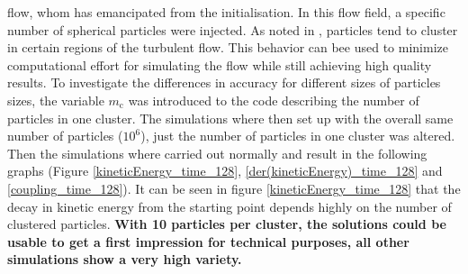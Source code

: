 \documentclass[11pt,a4paper,openany,oneside,parskip=half*]{article}
\begin{document}
flow, whom has emancipated from the initialisation. In this flow field, a specific number of spherical particles were injected. 
\newline
As noted in \cite{PreferentialConcentrationOfHeavyParticles}, particles tend to cluster in certain regions of the turbulent flow. This behavior can bee used to minimize computational effort for simulating the flow while still achieving high quality results. To investigate the differences in accuracy for different sizes of particles sizes, the variable $m_\mathrm{c}$ was introduced to the code describing the number of particles in one cluster. The simulations where then set up with the overall same number of particles ($ 10^6 $), just the number of particles in one cluster was altered. Then the simulations where carried out normally and result in the following graphs (Figure \ref{kineticEnergy_time_128}, \ref{der(kineticEnergy)_time_128} and \ref{coupling_time_128}). 
It can be seen in figure \ref{kineticEnergy_time_128} that the decay in kinetic energy from the starting point depends highly on the number of clustered particles. \textbf{With 10 particles per cluster, the solutions could be usable to get a first impression for technical purposes, all other simulations show a very high variety.}
\newline
\end{document}
